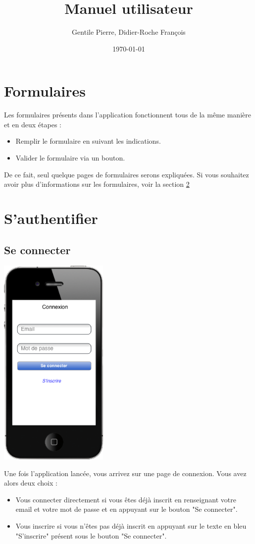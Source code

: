 \documentclass{article}
\author{Gentile Pierre, Didier-Roche François}
\date{\today}
\title{Manuel utilisateur}
\begin{document}
\maketitle

\newpage
\tableofcontents
\newpage

\section{Formulaires} \label{Formulaires}
Les formulaires présents dans l'application fonctionnent tous de la même manière et en deux étapes :
\begin{itemize}
  \item Remplir le formulaire en suivant les indications.
  \item Valider le formulaire via un bouton.
\end{itemize}

De ce fait, seul quelque pages de formulaires serons expliquées.
 Si vous souhaitez avoir plus d'informations sur les formulaires, voir la section \ref{S'authentifier}



\section{S'authentifier} \label{S'authentifier}
\subsection{Se connecter}
\begin{center}
  \includegraphics[width=150pt]{Interfaces/connexion}
\end{center}
Une fois l'application lancée, vous arrivez sur une page de connexion. Vous avez alors deux choix :
\begin{itemize}
  \item Vous connecter directement si vous êtes déjà inscrit en renseignant votre email et votre mot de passe et en appuyant sur le bouton "Se connecter".
  \item Vous inscrire si vous n'êtes pas déjà inscrit en appuyant sur le texte en bleu "S'inscrire" présent sous le bouton "Se connecter".
\end{itemize}
\end{document}
